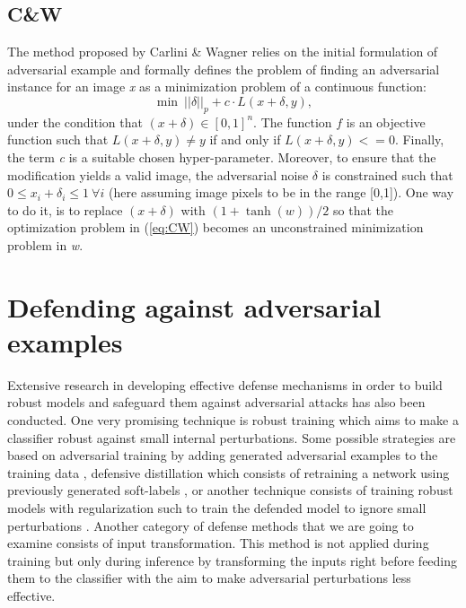 \subsection{C\&W}
The method proposed by Carlini \& Wagner \cite{carlini2016evaluating} relies on the initial formulation of adversarial example and formally defines the problem of finding an adversarial instance for an image \textit{x} as a minimization problem of a continuous function:
\begin{equation} \label{eq:CW}
\min \: ||\delta||_p+c \cdot L(x+\delta, y),
\end{equation}
under the condition that \((x+\delta)\in [0,1]^n\). The function \(f\) is an objective function such that \(L(x+\delta, y)\neq y\) if and only if \(L(x+\delta, y)<=0\). Finally, the term \textit{c} is a suitable chosen hyper-parameter. Moreover, to ensure that the modification yields a valid image, the adversarial noise \(\delta\) is constrained such that \(0\leq x_i+\delta_i\leq 1 \: \forall i\) (here assuming image pixels to be in the range [0,1]). One way to do it, is to replace \((x+\delta)\) with \((1+\tanh(w))/2\) so that the optimization problem in (\ref{eq:CW}) becomes an unconstrained minimization problem in \textit{w}.

\section{Defending against adversarial examples}
Extensive research in developing effective defense mechanisms in order to build robust models and safeguard them against adversarial attacks has also been conducted. One very promising technique is robust training which aims to make a classifier robust against small internal perturbations. Some possible strategies are based on adversarial training by adding generated adversarial examples to the training data \cite{goodfellow2014explaining}, defensive distillation which consists of retraining a network using previously generated soft-labels \cite{papernot2016distillation}, or another technique consists of training robust models with regularization such to train the defended model to ignore small perturbations \cite{hein2017formal}. Another category of defense methods that we are going to examine consists of input transformation. This method is not applied during training but only during inference by transforming the inputs right before feeding them to the classifier with the aim to make adversarial perturbations less effective.

